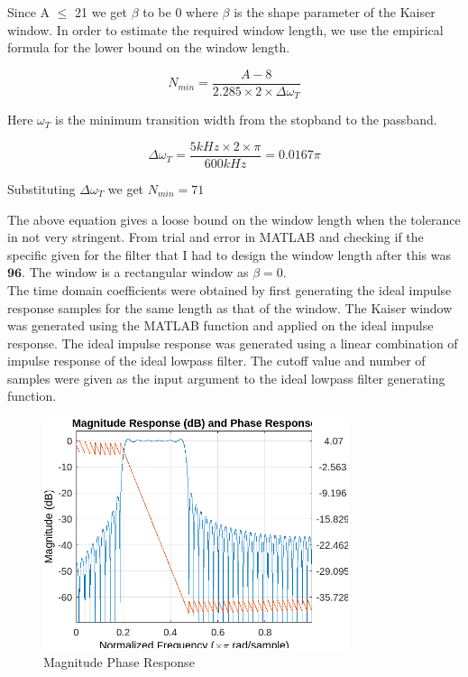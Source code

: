 \documentclass{scrartcl}
\begin{document}
Since A $\leq$ 21 we get $\beta$ to be 0 where $\beta$ is the shape parameter of the Kaiser window.
In order to estimate the required window length, we use the empirical formula for the lower bound on the window length.

\begin{equation}
    N_{min} = \frac{A - 8}{2.285\times2\times\Delta\omega_{T}}
\end{equation}

Here $\omega_{T}$ is the minimum transition width from the stopband to the passband.

\begin{equation}
    \Delta\omega_{T} = \frac{5kHz\times2\times\pi}{600kHz} = 0.0167\pi
\end{equation}

Substituting $\Delta\omega_{T}$ we get $N_{min} = 71$

The above equation gives a loose bound on the window length when the tolerance in not very stringent. From trial and error in MATLAB and checking if the specific given for the filter that I had to design the window length after this was $\textbf{96}$. The window is a rectangular window as $\beta = 0$.\\

The time domain coefficients were obtained by first generating the ideal impulse response samples for the same length as that of the window. The Kaiser window was generated using the MATLAB function and applied  on the ideal impulse response. The ideal impulse response was generated using a linear combination of impulse response of the ideal lowpass filter. The cutoff value and number of samples were given as the input argument to the ideal lowpass filter generating function.\\

\begin{figure}[ht!]
    \centering
    \includegraphics[width = 0.8\textwidth]{Graphics/MagPhaseBandpass.png}
    \caption{Magnitude Phase Response}
\end{figure}
\end{document}
